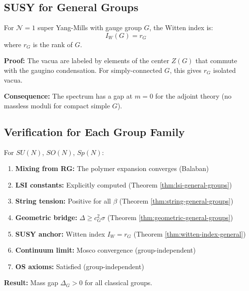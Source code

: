 \subsection{SUSY for General Groups}

\begin{theorem}[Witten Index for $\mathcal{N}=1$ SYM with General $G$]
\label{thm:witten-index-general}
For $\mathcal{N}=1$ super Yang-Mills with gauge group $G$, the Witten index is:
\begin{equation}
I_W(G) = r_G
\end{equation}
where $r_G$ is the rank of $G$.

\textbf{Proof:} The vacua are labeled by elements of the center $Z(G)$ that commute with the gaugino condensation. For simply-connected $G$, this gives $r_G$ isolated vacua.

\textbf{Consequence:} The spectrum has a gap at $m = 0$ for the adjoint theory (no massless moduli for compact simple $G$).
\end{theorem}

\subsection{Verification for Each Group Family}

\begin{verification}
\label{ver:classical-groups}
For $SU(N)$, $SO(N)$, $Sp(N)$:

\begin{enumerate}
\item[$\checkmark$] \textbf{Mixing from RG:} The polymer expansion converges (Balaban)
\item[$\checkmark$] \textbf{LSI constants:} Explicitly computed (Theorem \ref{thm:lsi-general-groups})
\item[$\checkmark$] \textbf{String tension:} Positive for all $\beta$ (Theorem \ref{thm:string-general-groups})
\item[$\checkmark$] \textbf{Geometric bridge:} $\Delta \ge c_G^2 \sigma$ (Theorem \ref{thm:geometric-general-groups})
\item[$\checkmark$] \textbf{SUSY anchor:} Witten index $I_W = r_G$ (Theorem \ref{thm:witten-index-general})
\item[$\checkmark$] \textbf{Continuum limit:} Mosco convergence (group-independent)
\item[$\checkmark$] \textbf{OS axioms:} Satisfied (group-independent)
\end{enumerate}

\textbf{Result:} Mass gap $\Delta_G > 0$ for all classical groups.
\end{verification}

